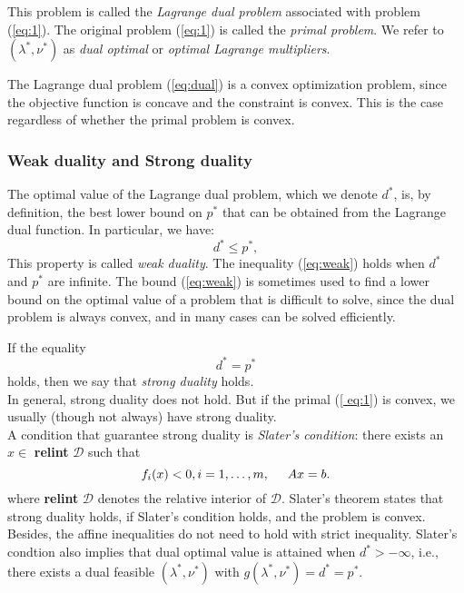 \documentclass{article}
\begin{document}
This problem is called the \textit{Lagrange dual problem} associated with problem (\ref{eq:1}). The original problem (\ref{eq:1}) is called the \textit{primal problem}. We refer to $(\lambda^*, \nu^*)$ as \textit{dual optimal} or \textit{optimal Lagrange multipliers}.

The Lagrange dual problem (\ref{eq:dual}) is a convex optimization problem, since the objective function is concave and the constraint is convex. This is the case regardless of whether the primal problem is convex.

\subsubsection{Weak duality and Strong duality}
The optimal value of the Lagrange dual problem, which we denote $d^*$, is, by definition, the best lower bound on $p^*$ that can be obtained from the Lagrange dual function. In particular, we have:
\begin{equation}\label{eq:weak}
d^* \le p^* ,
\end{equation}
This property is called \textit{weak duality}. The inequality (\ref{eq:weak}) holds when $d^*$ and $p^*$ are infinite. The bound (\ref{eq:weak}) is sometimes used to find a lower bound on the optimal value of a problem that is difficult to solve, since the dual problem is always convex, and in many cases can be solved efficiently. \newline

If the equality
\begin{equation} \label{eq:strong}
d^* = p^*
\end{equation}
holds, then we say that \textit{strong duality} holds. \\

In general, strong duality does not hold. But if the primal (\ref{
eq:1}) is convex, we usually (though not always) have strong duality. \\

A condition that guarantee strong duality is \textit{Slater's condition}: there exists an $x \in $ \textbf{relint} $\mathcal{D}$ such that 
\begin{equation}\label{eq:Slater}
f_i(x) < 0, i = 1, \ldots, m, \hspace{0.5cm} Ax = b.
\end{equation}
where  \textbf{relint} $\mathcal{D}$ denotes the relative interior of $\mathcal{D}$. Slater's theorem states that strong duality holds, if Slater's condition holds, and the problem is convex. Besides, the affine inequalities do not need to hold with strict inequality. Slater's condtion also implies that dual optimal value is attained when $d^* > - \infty$, i.e., there exists a dual feasible $(\lambda^*, \nu^*)$ with $g(\lambda^*,\nu^*) = d^* = p^*$.
\end{document}
